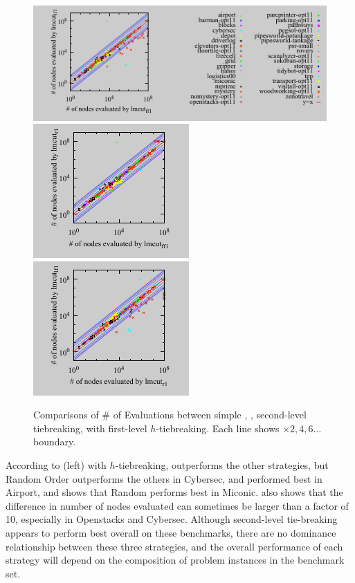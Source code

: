 \begin{figure}[tb]
 \centering {}
 \includegraphics{tables/aaai16-30min/aaai16prelim3/evaluated-lmcut_ff-lmcut_lf.pdf}
 \includegraphics{tables/aaai16-30min/aaai16prelim3/evaluated-nokey-lmcut_ff-lmcut_r.pdf}
 \includegraphics{tables/aaai16-30min/aaai16prelim3/evaluated-nokey-lmcut_r-lmcut_lf.pdf}
 \caption{Comparisons of \# of Evaluations between simple \lifo, \fifo,
 \ro second-level tiebreaking, with first-level $h$-tiebreaking. Each
 line shows $\times 2,4,6\ldots$ boundary.}  \label{f-h-eval}
\end{figure}

According to  (left) with $h$-tiebreaking, \lifo
outperforms the other strategies, but Random Order outperforms the others in
Cybersec, and \fifo performed best in Airport, and
 shows that Random performs best in Miconic.
 also shows that the difference in number of nodes evaluated can sometimes be larger than a factor of 10,
especially in Openstacks and Cybersec.
Although \lifo second-level tie-breaking appears to perform best overall on these benchmarks, 
there are no dominance relationship between these three strategies, and the overall performance of each strategy will depend on the composition of problem instances in the benchmark set.

